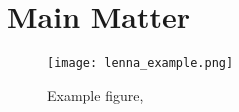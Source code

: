 \section{Main Matter}

\begin{figure}
    \centering
    \texttt{[image: lenna\_example.png]}
    \caption{Example figure, \cite{lenna}}
\end{figure}

